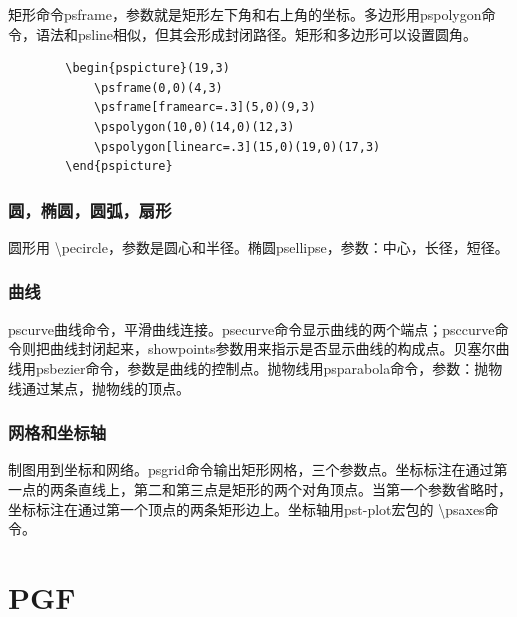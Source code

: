 \documentclass[16pt]{article}
\begin{document}
    矩形命令psframe，参数就是矩形左下角和右上角的坐标。多边形用pspolygon命令，语法和psline相似，但其会形成封闭路径。矩形和多边形可以设置圆角。\par
    \begin{lstlisting}
        \begin{pspicture}(19,3)
            \psframe(0,0)(4,3)
            \psframe[framearc=.3](5,0)(9,3)
            \pspolygon(10,0)(14,0)(12,3)
            \pspolygon[linearc=.3](15,0)(19,0)(17,3)
        \end{pspicture}
    \end{lstlisting}
\subsubsection{圆，椭圆，圆弧，扇形}
圆形用 \textbackslash pecircle，参数是圆心和半径。椭圆psellipse，参数：中心，长径，短径。\par

\subsubsection{曲线}
pscurve曲线命令，平滑曲线连接。psecurve命令显示曲线的两个端点；psccurve命令则把曲线封闭起来，showpoints参数用来指示是否显示曲线的构成点。贝塞尔曲线用psbezier命令，参数是曲线的控制点。抛物线用psparabola命令，参数：抛物线通过某点，抛物线的顶点。\par

\subsubsection{网格和坐标轴}
制图用到坐标和网络。psgrid命令输出矩形网格，三个参数点。坐标标注在通过第一点的两条直线上，第二和第三点是矩形的两个对角顶点。当第一个参数省略时，坐标标注在通过第一个顶点的两条矩形边上。坐标轴用pst-plot宏包的 \textbackslash psaxes命令。\par

\section{PGF}
\end{document}
